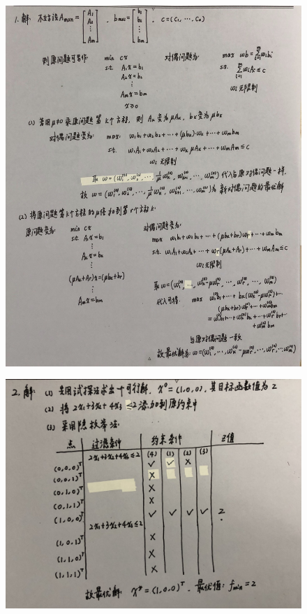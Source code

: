 \documentclass[a4paper]{article}
\begin{document}
\begin{figure}[htbp]
	\centering
	\includegraphics[width=\textwidth]{1.JPG}
\end{figure}
\begin{figure}[tp]
	\centering
	\includegraphics[width=\textwidth]{2.JPG}
\end{figure}
\end{document}
